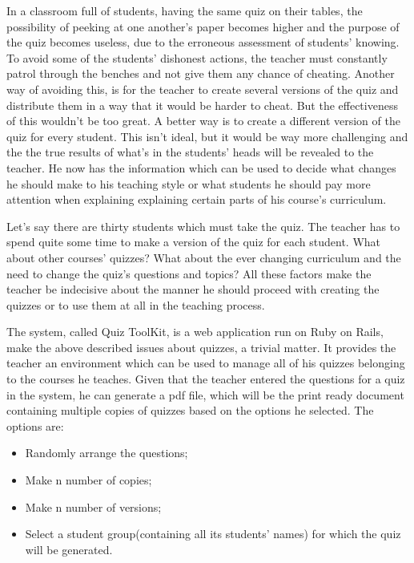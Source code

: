 In a classroom full of students, having the same quiz on their tables, the possibility of peeking at one another’s paper becomes higher and the purpose of the quiz becomes useless, due to the erroneous assessment of students’ knowing. To avoid some of the students’ dishonest actions, the teacher must constantly patrol through the benches and not give them any chance of cheating. Another way of avoiding this, is for the teacher to create several versions of the quiz and distribute them in a way that it would be harder to cheat. But the effectiveness of this wouldn’t be too great. A better way is to create a different version of the quiz for every student. This isn’t ideal, but it would be way more challenging and the the true results of what’s in the students’ heads will be revealed to the teacher. He now has the information which can be used to decide what changes he should make to his teaching style or what students he should pay more attention when explaining  explaining certain parts of his course’s curriculum. 

Let’s say there are thirty students which must take the quiz. The teacher has to spend quite some time to make a version of the quiz for each student. What about other courses’ quizzes? What about the ever changing curriculum and the need to change the quiz’s questions and topics? All these factors make the teacher be indecisive about the manner he should proceed with creating the quizzes or to use them at all in the teaching process. 



The system, called Quiz ToolKit, is a web application run on Ruby on Rails, make the above described issues about quizzes, a trivial matter. It provides the teacher an environment which can be used to manage all of his quizzes belonging to the courses he teaches. Given that the teacher entered the questions for a quiz in the system, he can generate a pdf file, which will be the print ready document containing multiple copies of quizzes based on the options he selected. The options are: 

\begin{itemize}
  \item Randomly arrange the questions;
  \item Make n number of copies;
  \item Make n number of versions;
  \item Select a student group(containing all its students’ names) for which the quiz will be generated.    
\end{itemize}

